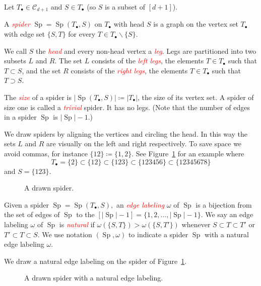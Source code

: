 \documentclass[ALCO,ThmDefs,Unicode,epreuves]{cedram}
\newcommand{\important}[1]{\emph{\textcolor{red}{#1}}}
\DeclareMathOperator{\Sp}{Sp}
\newcommand{\CC}{\mathcal{C}}
\begin{document}
\begin{defi}
	Let $T_\bullet\in\CC_{d+1}$ and $S\in T_\bullet$ (so $S$ is a subset of $[d+1]$). 
	
	A \important{spider} $\Sp = \Sp(T_\bullet, S)$ on $T_\bullet$ with head $S$ is a graph on the vertex set $T_\bullet$ with edge set $\{S,T\}$ for every $T\in T_\bullet\backslash\{S\}$.
	
	We call $S$ the \important{head} and every non-head vertex a \important{leg}. Legs are partitioned into two subsets $L$ and $R$. The set $L$ consists of the \important{left legs}, the elements $T\in T_\bullet$ such that $T\subset S$, and the set $R$ consists of the \important{right legs}, the elements $T\in T_\bullet$ such that $T\supset S$.
	
	The \important{size} of a spider is $|\Sp(T_\bullet,S)|\coloneqq |T_\bullet|$, the size of its vertex set. A spider of size one is called a \important{trivial} spider. It has no legs. (Note that the number of edges in a spider $\Sp$ is $|\Sp|-1.$)
\end{defi}
\begin{exam}
	We draw spiders by aligning the vertices and circling the head. In this way the sets $L$ and $R$ are visually on the left and right respectively. To save space we avoid commas, for instance $\{12\}\coloneqq \{1,2\}$.
	See Figure~\ref{ex:1st} for an example where 
	\[ 
	T_\bullet =\{2\}\subset \{12\}\subset \{123\}\subset \{123456\}\subset \{12345678\}
	\]
	 and $S=\{123\}$.
	 
	\begin{figure}[ht]
		
		\caption{A drawn spider.}\label{ex:1st}
	\end{figure}
\end{exam}

Given a spider $\Sp=\Sp(T_\bullet, S),$ an \important{edge labeling} $\omega$ of $\Sp$ is a bijection from the set of edges of $\Sp$ to the $[|\Sp|-1] =\{1, 2, \dots, |\Sp|-1\}.$ We say an edge labeling $\omega$ of $\Sp$ is \important{natural} if $\omega(\{S,T\})>\omega(\{S,T'\})$ whenever $S\subset T\subset T'$ or $T'\subset T\subset S$. We use notation $(\Sp, \omega)$ to indicate a spider $\Sp$ with a natural edge labeling $\omega$. 
\begin{exam}
	We draw a natural edge labeling on the spider of Figure~\ref{ex:1st}.

	\begin{figure}[ht]
		
		\caption{A drawn spider with a natural edge labeling.}
	\end{figure}

\end{exam}
\end{document}
